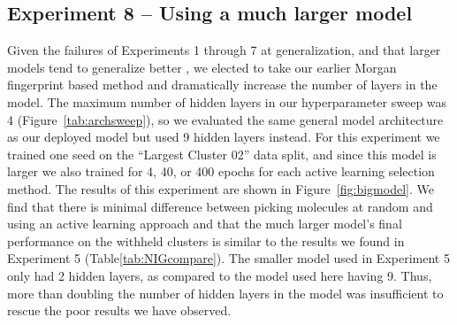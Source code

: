 \documentclass[journal=jmcmar,manuscript=article]{achemso}
\begin{document}
\subsection{Experiment 8 -- Using a much larger model}

Given the failures of Experiments 1 through 7 at generalization, and that larger models tend to generalize better \cite{bigmodelgeneralize}, we elected to take our earlier Morgan fingerprint based method and dramatically increase the number of layers in the model. The maximum number of hidden layers in our hyperparameter sweep was 4 (Figure~\ref{tab:archsweep}), so we evaluated the same general model architecture as our deployed model but used 9 hidden layers instead. For this experiment we trained one seed on the ``Largest Cluster 02'' data split, and since this model is larger we also trained for 4, 40, or 400 epochs for each active learning selection method. The results of this experiment are shown in Figure~\ref{fig:bigmodel}. We find that there is minimal difference between picking molecules at random and using an active learning approach and that the much larger model's final performance on the withheld clusters is similar to the results we found in Experiment 5 (Table\ref{tab:NIGcompare}). The smaller model used in Experiment 5 only had 2 hidden layers, as compared to the model used here having 9. Thus, more than doubling the number of hidden layers in the model was insufficient to rescue the poor results we have observed.
\end{document}
